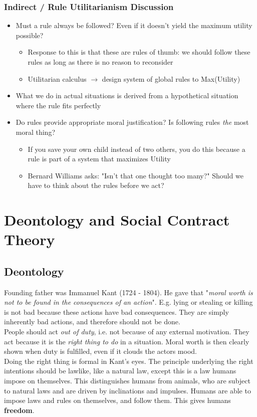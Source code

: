 \documentclass{article}
\begin{document}
        \subsubsection{Indirect / Rule Utilitarianism Discussion}
        \begin{itemize}
            \item Must a rule always be followed? Even if it doesn't yield the maximum utility possible?
            \begin{itemize}
                \item Response to this is that these are rules of thumb: we should follow these rules as long as there is no reason to reconsider
                \item Utilitarian calculus $\longrightarrow$ design system of global rules to Max(Utility)
            \end{itemize}
            \item What we do in actual situations is derived from a hypothetical situation where the rule fits perfectly
            \item Do rules provide appropriate moral justification? Is following rules \textit{the} most moral thing?
            \begin{itemize}
                \item If you save your own child instead of two others, you do this because a rule is part of a system that maximizes Utility
                \item Bernard Williams asks: "Isn't that one thought too many?" Should we have to think about the rules before we act?
            \end{itemize}
        \end{itemize}

\section{Deontology and Social Contract Theory}        
    \subsection{Deontology}
    Founding father was Immanuel Kant (1724 - 1804). He gave that "\textit{moral worth is not to be found in the consequences of an action}". E.g. lying or stealing or killing is not bad because these actions have bad consequences. They are simply inherently bad actions, and therefore should not be done.
    \\People should act \textit{out of duty}, i.e. not because of any external motivation. They act because it is the \textit{right thing to do} in a situation. Moral worth is then clearly shown when duty is fulfilled, even if it clouds the actors mood.
    \\Doing the right thing is formal in Kant's eyes. The principle underlying the right intentions should be lawlike, like a natural law, except this is a law humans impose on themselves. This distinguishes humans from animals, who are subject to natural laws and are driven by inclinations and impulses. Humans are able to impose laws and rules on themselves, and follow them. This gives humans \textbf{freedom}.
\end{document}
